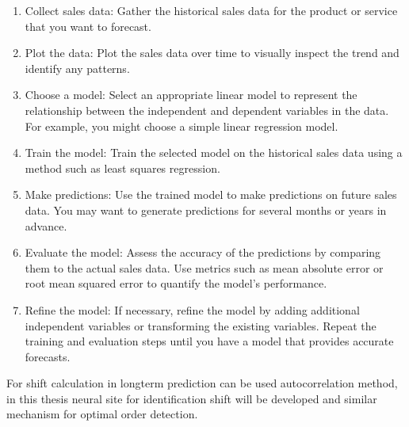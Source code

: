 \begin{enumerate}
    \item Collect sales data: Gather the historical sales data for the product or service that you want to forecast.
    \item Plot the data: Plot the sales data over time to visually inspect the trend and identify any patterns.
    \item Choose a model: Select an appropriate linear model to represent the relationship between the independent and dependent variables in the data.
    For example, you might choose a simple linear regression model.
    \item Train the model: Train the selected model on the historical sales data using a method such as least squares regression.
    \item Make predictions: Use the trained model to make predictions on future sales data. You may want to generate predictions for several
    months or years in advance.
    \item Evaluate the model: Assess the accuracy of the predictions by comparing them to the actual sales data. Use metrics such as mean absolute
    error or root mean squared error to quantify the model's performance.
    \item Refine the model: If necessary, refine the model by adding additional independent variables or transforming the existing variables.
    Repeat the training and evaluation steps until you have a model that provides accurate forecasts.
\end{enumerate}
For shift calculation in longterm prediction can be used autocorrelation method, in this thesis neural site for identification shift
will be developed and similar mechanism for optimal order detection.

